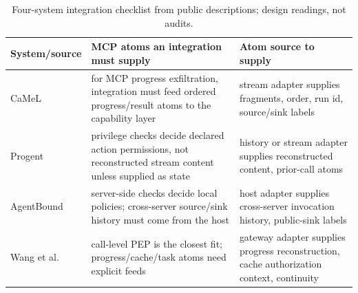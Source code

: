 \begin{table}[t]
  \caption{Four-system integration checklist from public descriptions; design readings, not audits.}
  \label{tab:architecture-analysis}
  \centering\scriptsize
  \setlength{\tabcolsep}{2.5pt}
  \begin{tabular}{@{}>{\raggedright\arraybackslash}p{}>{\raggedright\arraybackslash}p{}>{\raggedright\arraybackslash}p{}@{}}
    \toprule
    System/source & MCP atoms an integration must supply & Atom source to supply \\
    \midrule
    CaMeL~\cite[Sec.~5, Fig.~5]{camel} & for MCP progress exfiltration, integration must feed ordered progress/result atoms to the capability layer & stream adapter supplies fragments, order, run id, source/sink labels \\
    Progent~\cite[Sec.~3]{progent} & privilege checks decide declared action permissions, not reconstructed stream content unless supplied as state & history or stream adapter supplies reconstructed content, prior-call atoms \\
    AgentBound~\cite[Sec.~3]{agentbound} & server-side checks decide local policies; cross-server source/sink history must come from the host & host adapter supplies cross-server invocation history, public-sink labels \\
    Wang et al.~\cite[Secs.~3.2--3.3, 4.9]{wangpep} & call-level PEP is the closest fit; progress/cache/task atoms need explicit feeds & gateway adapter supplies progress reconstruction, cache authorization context, continuity \\
    \bottomrule
  \end{tabular}
\end{table}

